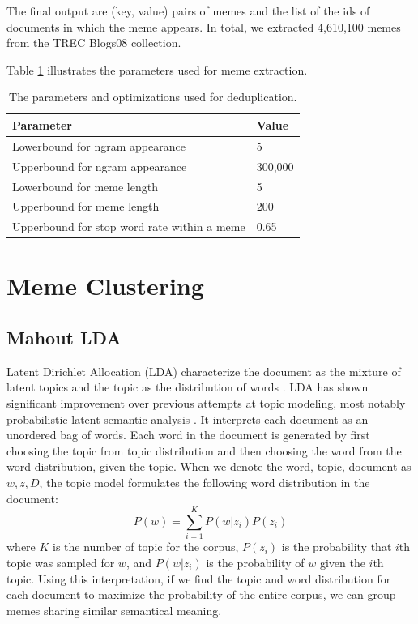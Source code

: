 \documentclass{sig-alternate}
\begin{document}
The final output are (key, value) pairs of memes and the list of the ids of documents in which the meme appears. In total, we extracted 4,610,100 memes from the TREC Blogs08 collection.

Table \ref{table:memeext} illustrates the parameters used for meme extraction.

\begin{table}[h!t!]
\begin{center}
\begin{tabular}{l|l}

\hline
\textbf{Parameter} & \textbf{Value}\\

\hline
Lowerbound for ngram appearance & 5\\
\hline
Upperbound for ngram appearance & 300,000\\
\hline
Lowerbound for meme length & 5\\
\hline
Upperbound for meme length & 200\\

\hline
Upperbound for stop word rate within a meme & 0.65\\

\hline
\end{tabular}
\caption{The parameters and optimizations used for deduplication.}
\label{table:memeext}
\end{center}
\end{table}

\section{Meme Clustering}

\subsection{Mahout LDA}
Latent Dirichlet Allocation (LDA) characterize the document as the mixture of latent topics and the topic as the distribution of words \cite{Blei2003a}. LDA has shown significant improvement over previous attempts at topic modeling, most notably probabilistic latent semantic analysis \cite{Hofmann1999}. It interprets each document as an unordered bag of words. Each word in the document is generated by first choosing the topic from topic distribution and then choosing the word from the word distribution, given the topic. When we denote the word, topic, document as $w, z, D$, the topic model formulates the following word distribution in the document:
\begin{displaymath}
 P(w)=\sum_{i=1}^K P(w|z_i)P(z_i)
\end{displaymath}
where $K$ is the number of topic for the corpus, $P(z_i)$ is the probability that $i$th topic was sampled for $w$, and $P(w|z_i)$ is the probability of $w$ given the $i$th topic. Using this interpretation, if we find the topic and word distribution for each document to maximize the probability of the entire corpus, we can group memes sharing similar semantical meaning.
\end{document}
